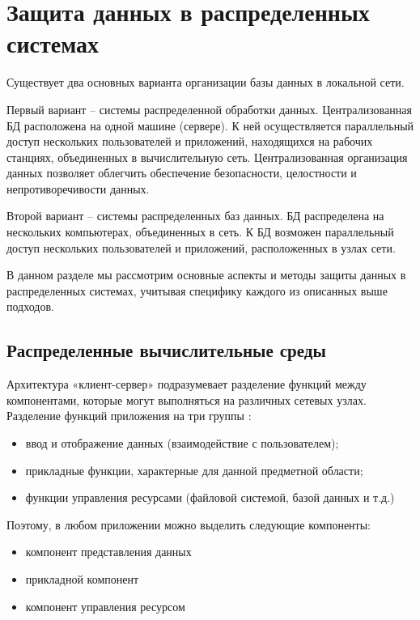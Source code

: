 \section{Защита данных в распределенных системах}

Существует два основных варианта организации базы данных в локальной сети.

Первый вариант – системы распределенной обработки данных. Централизованная БД расположена на одной машине (сервере). К ней осуществляется параллельный доступ нескольких пользователей и приложений, находящихся на рабочих станциях, объединенных в вычислительную сеть. Централизованная организация данных позволяет облегчить обеспечение безопасности, целостности и непротиворечивости данных.

Второй вариант – системы распределенных баз данных. БД распределена на нескольких компьютерах, объединенных в сеть. К БД возможен параллельный доступ нескольких пользователей и приложений, расположенных в узлах сети. \autocite{Sergeeva}

В данном разделе мы рассмотрим основные аспекты и методы защиты данных в распределенных системах, учитывая специфику каждого из описанных выше подходов.

\subsection{Распределенные вычислительные среды}

Архитектура «клиент-сервер» подразумевает разделение функций между компонентами, которые могут выполняться на различных сетевых узлах.
Разделение функций приложения на три группы \autocite{4studClntSrv}:
\begin{itemize}
    \item ввод и отображение данных (взаимодействие с пользователем);
    \item прикладные функции, характерные для данной предметной области;
    \item функции управления ресурсами (файловой системой, базой данных и т.д.)
\end{itemize}

Поэтому, в любом приложении можно выделить следующие компоненты:
\begin{itemize}
    \item компонент представления данных
    \item прикладной компонент
    \item компонент управления ресурсом
\end{itemize}


